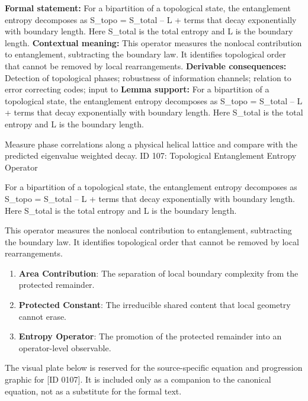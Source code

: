 \begingroup\footnotesize\setlength{\emergencystretch}{3em}\sloppy
\textbf{Formal statement:} For a bipartition of a topological state, the entanglement entropy decomposes as S\_topo = S\_total -- L + terms that decay exponentially with boundary length. Here S\_total is the total entropy and L is the boundary length.
\textbf{Contextual meaning:} This operator measures the nonlocal contribution to entanglement, subtracting the boundary law. It identifies topological order that cannot be removed by local rearrangements.
\textbf{Derivable consequences:} Detection of topological phases; robustness of information channels; relation to error correcting codes; input to
\textbf{Lemma support:} For a bipartition of a topological state, the entanglement entropy decomposes as S\_topo = S\_total -- L + terms that decay exponentially with boundary length. Here S\_total is the total entropy and L is the boundary length.\par
\endgroup

Measure phase correlations along a physical helical lattice and compare with the predicted eigenvalue weighted decay. ID 107: Topological Entanglement Entropy Operator

For a bipartition of a topological state, the entanglement entropy decomposes as S\_topo = S\_total -- L + terms that decay exponentially with boundary length. Here S\_total is the total entropy and L is the boundary length.

This operator measures the nonlocal contribution to entanglement, subtracting the boundary law. It identifies topological order that cannot be removed by local rearrangements.
\endgroup

\begin{enumerate}[leftmargin=1.6em,itemsep=6pt,topsep=4pt]
\item \textbf{Area Contribution}: The separation of local boundary complexity from the protected remainder.
\item \textbf{Protected Constant}: The irreducible shared content that local geometry cannot erase.
\item \textbf{Entropy Operator}: The promotion of the protected remainder into an operator-level observable.
\end{enumerate}

\begingroup\footnotesize\sloppy
The visual plate below is reserved for the source-specific equation and progression graphic for [ID 0107]. It is included only as a companion to the canonical equation, not as a substitute for the formal text.
\par\endgroup
\ifTZPDarkEdition
{}
\fi

